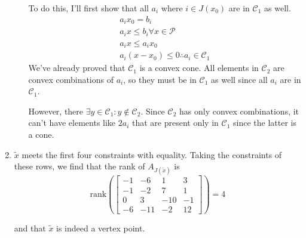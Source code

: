 \documentclass[12pt]{article}
\begin{document}
\begin{enumerate}
\begin{enumerate}
                        To do this, I'll first show that all $a_{i}$
                        where $i \in J\left(x_{0}\right)$ are in $\mathcal{C}_{1}$ as well.
                        \begin{gather*}
                              a_{i} x_{0}=b_{i} \\
                              a_{i} x \leq b_{i} \forall x \in \mathcal{P} \\
                              a_{i} x \leq a_{i} x_{0} \\
                              a_{i}\left(x-x_{0}\right) \leq 0 \therefore a_{i} \in \mathcal{C}_{1}
                        \end{gather*}
                        We've already proved that $\mathcal{C}_{1}$ is a convex cone.
                        All elements in $\mathcal{C}_{2}$ are convex combinations of $a_{i}$,
                        so they must be in $\mathcal{C}_{1}$ as well since all $a_{i}$ are in $\mathcal{C}_{1}$.

                        However, there $\exists y \in \mathcal{C}_1: y \notin \mathcal{C}_2$.
                        Since $\mathcal{C}_2$ has only convex combinations, it can't
                        have elements like $2a_i$ that are present only in $\mathcal{C}_1$
                        since the latter is a cone.
            \end{enumerate}
      \item $\tilde{x}$ meets the first four constraints with equality.
            Taking the constraints of these rows,
            we find that the rank of $A_{J(\tilde{x})}$ is
            \[\text{rank}\left(\left[\begin{array}{cccc}
                              -1 & -6  & 1   & 3  \\
                              -1 & -2  & 7   & 1  \\
                              0  & 3   & -10 & -1 \\
                              -6 & -11 & -2  & 12
                        \end{array}\right]\right)=4\]

            and that $\tilde{x}$ is indeed a vertex point.


\end{enumerate}
\end{document}

